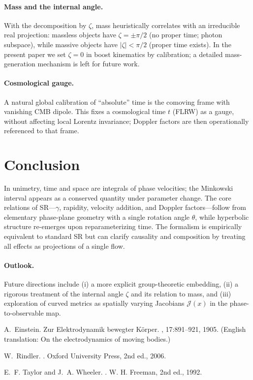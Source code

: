 \documentclass[11pt]{article}
\numberwithin{equation}{section}
\begin{document}
\paragraph{Mass and the internal angle.} With the decomposition by $\zeta$, mass heuristically correlates with an irreducible real projection: massless objects have $\zeta=\pm\pi/2$ (no proper time; photon subspace), while massive objects have $|\zeta|<\pi/2$ (proper time exists). In the present paper we set $\zeta=0$ in boost kinematics by calibration; a detailed mass-generation mechanism is left for future work.

\paragraph{Cosmological gauge.} A natural global calibration of ``absolute'' time is the comoving frame with vanishing CMB dipole. This fixes a cosmological time $t$ (FLRW) as a gauge, without affecting local Lorentz invariance; Doppler factors are then operationally referenced to that frame.

\section{Conclusion}
In unimetry, time and space are integrals of phase velocities; the Minkowski interval appears as a conserved quantity under parameter change. The core relations of SR---$\gamma$, rapidity, velocity addition, and Doppler factors---follow from elementary phase-plane geometry with a single rotation angle $\theta$, while hyperbolic structure re-emerges upon reparameterizing time. The formalism is empirically equivalent to standard SR but can clarify causality and composition by treating all effects as projections of a single flow.

\paragraph{Outlook.} Future directions include (i) a more explicit group-theoretic embedding, (ii) a rigorous treatment of the internal angle $\zeta$ and its relation to mass, and (iii) exploration of curved metrics as spatially varying Jacobians $\mathcal{J}(x)$ in the phase-to-observable map.


\begin{thebibliography}{9}

A.~Einstein.
\newblock Zur Elektrodynamik bewegter K\"{o}rper.
, 17:891--921, 1905.
(English translation: On the electrodynamics of moving bodies.)

W.~Rindler.
.
\newblock Oxford University Press, 2nd ed., 2006.

E.~F. Taylor and J.~A. Wheeler.
.
\newblock W. H. Freeman, 2nd ed., 1992.

\end{thebibliography}
\end{document}
